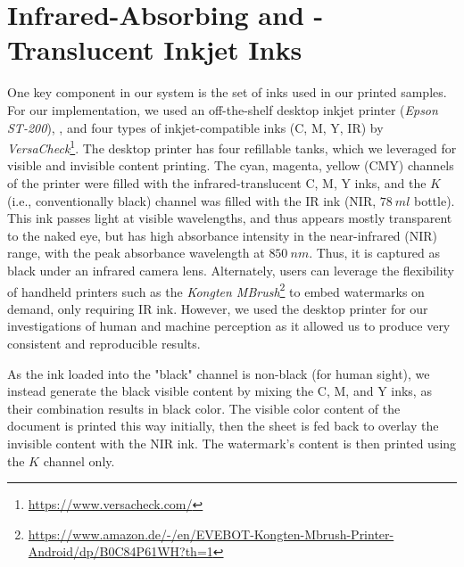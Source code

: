 \section{Infrared-Absorbing and -Translucent Inkjet Inks}
\label{inks}



One key component in our system is the set of inks used in our printed samples.
For our implementation, we used an off-the-shelf desktop inkjet printer (\textit{Epson ST-200}), , and four types of inkjet-compatible inks (C, M, Y, IR) by \textit{VersaCheck}\footnote{\url{https://www.versacheck.com/}}.
The desktop printer has four refillable tanks, which we leveraged for visible and invisible content printing. The cyan, magenta, yellow (CMY) channels of the printer were filled with the infrared-translucent C, M, Y inks, and the $K$ (i.e., conventionally black) channel was filled with the IR ink (NIR, $78~ml$ bottle). This ink passes light at visible wavelengths, and thus appears mostly transparent to the naked eye, but has high absorbance intensity in the near-infrared (NIR) range, with the peak absorbance wavelength at $850~nm$. Thus, it is captured as black under an infrared camera lens. Alternately, users can leverage the flexibility of handheld printers \cite{Pourjafarian2022Print} such as the \textit{Kongten MBrush}\footnote{\url{https://www.amazon.de/-/en/EVEBOT-Kongten-Mbrush-Printer-Android/dp/B0C84P61WH?th=1}} to embed watermarks on demand, only requiring IR ink. However, we used the desktop printer for our investigations of human and machine perception as it allowed us to produce very consistent and reproducible results.


As the ink loaded into the "black" channel is non-black (for human sight), we instead generate the black visible content by mixing the C, M, and Y inks, as their combination results in black color.
The visible color content of the document is printed this way initially, then the sheet is fed back to overlay the invisible content with the NIR ink. The watermark's content is then printed using the $K$ channel only.



